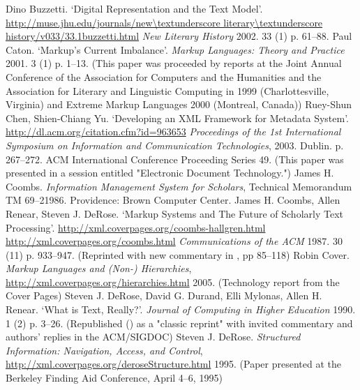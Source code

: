 \begin{bibitemlist}{1}
\label{Buzzetti2002}Dino Buzzetti. ‘Digital Representation and the Text Model’.  \url{http://muse.jhu.edu/journals/new\textunderscore literary\textunderscore history/v033/33.1buzzetti.html} \textit{New Literary History} 2002. 33  (1)  p. 61–88. 
\label{Caton2001}Paul Caton. ‘Markup's Current Imbalance’. \textit{Markup Languages: Theory and Practice} 2001. 3  (1)  p. 1–13.  (This paper was proceeded by reports at the Joint Annual Conference of the Association for Computers and the Humanities and the Association for Literary and Linguistic Computing in 1999 (Charlottesville, Virginia) and Extreme Markup Languages 2000 (Montreal, Canada))
\label{ChenandYu2003}Ruey-Shun Chen, Shien-Chiang Yu. ‘Developing an XML Framework for Metadata System’.  \url{http://dl.acm.org/citation.cfm?id=963653} \textit{Proceedings of the 1st International Symposium on Information and Communication Technologies}, 2003. Dublin. p. 267–272. ACM International Conference Proceeding Series  49.  (This paper was presented in a session entitled "Electronic Document Technology.")
\label{Coombs1986}James H. Coombs. \textit{Information Management System for Scholars},  Technical Memorandum TM 69–21986. Providence: Brown Computer Center. 
\label{Coombsetal1987}James H. Coombs, Allen Renear, Steven J. DeRose. ‘Markup Systems and The Future of Scholarly Text Processing’.   \url{http://xml.coverpages.org/coombs-hallgren.html}  \url{http://xml.coverpages.org/coombs.html} \textit{Communications of the ACM} 1987. 30  (11)  p. 933–947.  (Reprinted with new commentary in \cite{Landow1993a}, pp 85–118)
\label{Cover2005}Robin Cover. \textit{Markup Languages and (Non-) Hierarchies},  \url{http://xml.coverpages.org/hierarchies.html} 2005.  (Technology report from the Cover Pages)
\label{DeRoseetal1990}Steven J. DeRose, David G. Durand, Elli Mylonas, Allen H. Renear. ‘What is Text, Really?’. \textit{Journal of Computing in Higher Education} 1990. 1  (2)  p. 3–26.  (Republished (\cite{DeRose1997a}) as a "classic reprint" with invited commentary and authors' replies in the ACM/SIGDOC)
\label{DeRose1995}Steven J. DeRose. \textit{Structured Information: Navigation, Access, and Control},  \url{http://xml.coverpages.org/deroseStructure.html} 1995.  (Paper presented at the Berkeley Finding Aid Conference, April 4–6, 1995)

\end{bibitemlist}
